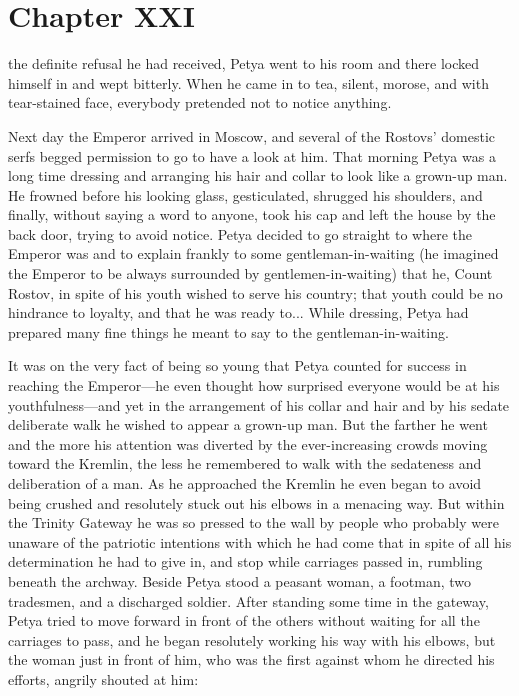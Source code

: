\chapter*{Chapter XXI}
\ifaudio
{} 
\fi

 the definite refusal he had received, Petya went to his
room and there locked himself in and wept bitterly. When he came
in to tea, silent, morose, and with tear-stained face, everybody
pretended not to notice anything.

Next day the Emperor arrived in Moscow, and several of the
Rostovs' domestic serfs begged permission to go to have a look at
him. That morning Petya was a long time dressing and arranging
his hair and collar to look like a grown-up man. He frowned
before his looking glass, gesticulated, shrugged his shoulders,
and finally, without saying a word to anyone, took his cap and
left the house by the back door, trying to avoid notice. Petya
decided to go straight to where the Emperor was and to explain
frankly to some gentleman-in-waiting (he imagined the Emperor to
be always surrounded by gentlemen-in-waiting) that he, Count
Rostov, in spite of his youth wished to serve his country; that
youth could be no hindrance to loyalty, and that he was ready
to... While dressing, Petya had prepared many fine things he
meant to say to the gentleman-in-waiting.

It was on the very fact of being so young that Petya counted for
success in reaching the Emperor---he even thought how surprised
everyone would be at his youthfulness---and yet in the
arrangement of his collar and hair and by his sedate deliberate
walk he wished to appear a grown-up man.  But the farther he went
and the more his attention was diverted by the ever-increasing
crowds moving toward the Kremlin, the less he remembered to walk
with the sedateness and deliberation of a man. As he approached
the Kremlin he even began to avoid being crushed and resolutely
stuck out his elbows in a menacing way. But within the Trinity
Gateway he was so pressed to the wall by people who probably were
unaware of the patriotic intentions with which he had come that
in spite of all his determination he had to give in, and stop
while carriages passed in, rumbling beneath the archway. Beside
Petya stood a peasant woman, a footman, two tradesmen, and a
discharged soldier. After standing some time in the gateway,
Petya tried to move forward in front of the others without
waiting for all the carriages to pass, and he began resolutely
working his way with his elbows, but the woman just in front of
him, who was the first against whom he directed his efforts,
angrily shouted at him:

